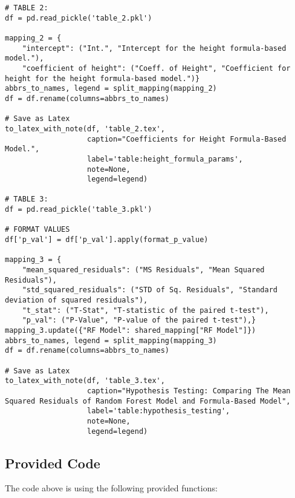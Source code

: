 \documentclass[11pt]{article}
\begin{document}
\begin{verbatim}
# TABLE 2:
df = pd.read_pickle('table_2.pkl')

mapping_2 = {
    "intercept": ("Int.", "Intercept for the height formula-based model."),
    "coefficient of height": ("Coeff. of Height", "Coefficient for height for the height formula-based model.")}
abbrs_to_names, legend = split_mapping(mapping_2)
df = df.rename(columns=abbrs_to_names)

# Save as Latex
to_latex_with_note(df, 'table_2.tex',
                   caption="Coefficients for Height Formula-Based Model.", 
                   label='table:height_formula_params',
                   note=None,
                   legend=legend)

# TABLE 3:
df = pd.read_pickle('table_3.pkl')

# FORMAT VALUES
df['p_val'] = df['p_val'].apply(format_p_value)

mapping_3 = {
    "mean_squared_residuals": ("MS Residuals", "Mean Squared Residuals"),
    "std_squared_residuals": ("STD of Sq. Residuals", "Standard deviation of squared residuals"),
    "t_stat": ("T-Stat", "T-statistic of the paired t-test"),
    "p_val": ("P-Value", "P-value of the paired t-test"),}
mapping_3.update({"RF Model": shared_mapping["RF Model"]})
abbrs_to_names, legend = split_mapping(mapping_3)
df = df.rename(columns=abbrs_to_names)

# Save as Latex
to_latex_with_note(df, 'table_3.tex',
                   caption="Hypothesis Testing: Comparing The Mean Squared Residuals of Random Forest Model and Formula-Based Model", 
                   label='table:hypothesis_testing',
                   note=None,
                   legend=legend)

\end{verbatim}

\subsection{Provided Code}
The code above is using the following provided functions:
\end{document}
